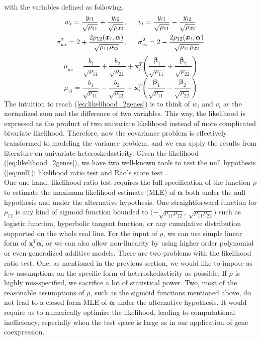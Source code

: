 \documentclass[aoas,preprint]{imsart}
\numberwithin{equation}{section}
\theoremstyle{plain}
\begin{document}
with the variables defined as following.
\begin{align*}
w_i = \frac{y_{i1}}{\sqrt{\rho_{11}}} + \frac{y_{i2}}{\sqrt{\rho_{22}}}, 
\hspace{6mm} &
v_i = \frac{y_{i1}}{\sqrt{\rho_{11}}} - \frac{y_{i2}}{\sqrt{\rho_{22}}}\\
\sigma_{wi}^2 = 2 + \frac{2\rho_{12}(\bm{x}_i, \bm{\alpha})}{\sqrt{\rho_{11}\rho_{22}}}, \hspace{6mm}&
\sigma_{vi}^2 = 2 - \frac{2\rho_{12}(\bm{x}_i, \bm{\alpha})}{\sqrt{\rho_{11}\rho_{22}}}
\end{align*}
$$\mu_{wi} = \frac{{b}_1}{\sqrt{\rho_{11}}} + \frac{{b}_2}{\sqrt{\rho_{22}}} + \bm{x}_i^T \left(\frac{\bm{\beta}_1}{\sqrt{\rho_{11}}} + \frac{\bm{\beta}_2}{\sqrt{\rho_{22}}}\right)$$
$$\mu_{vi} = \frac{{b}_1}{\sqrt{\rho_{11}}} - \frac{{b}_2}{\sqrt{\rho_{22}}} + \bm{x}_i^T \left(\frac{\bm{\beta}_1}{\sqrt{\rho_{11}}} - \frac{\bm{\beta}_2}{\sqrt{\rho_{22}}}\right)$$
The intuition to reach (\ref{eq:likelihood_2genes}) is to think of $w_i$ and $v_i$ as the normalized sum and the difference of two variables. This way, the likelihood is expressed as the product of two univariate likelihood instead of more complicated bivariate likelihood. Therefore, now the covariance problem is effectively transformed to modeling the variance problem, and we can apply the results from literature on univariate heteroskedasticity. Given the likelihood (\ref{eq:likelihood_2genes}), we have two well-known tools to test the null hypothesis (\ref{eq:null}): likelihood ratio test and Rao's score test \cite{breusch1979simple}. \\

One one hand, likelihood ratio test requires the full specification of the function $\rho$ to estimate the maximum likelihood estimate (MLE) of $\bm{\alpha}$ both under the null hypothesis and under the alternative hypothesis. One straightforward function for $\rho_{12}$ is any kind of sigmoid function bounded to $(-\sqrt{\rho_{11}\rho_{22}}$, $\sqrt{\rho_{11}\rho_{22}})$ such as logistic function, hyperbolic tangent function, or any cumulative distribution supported on the whole real line. For the input of $\rho$, we can use simple linear form of $\bm{x}_i^T\bm{\alpha}$, or we can also allow non-linearity by using higher order polynomial or even generalized additive models. There are two problems with the likelihood ratio test. One, as mentioned in the previous section, we would like to impose as few assumptions on the specific form of heteroskedasticity as possible. If $\rho$ is highly mis-specified, we sacrifice a lot of statistical power. Two, most of the reasonable assumptions of $\rho$, such as the sigmoid functions mentioned above, do not lead to a closed form MLE of $\bm{\alpha}$ under the alternative hypothesis. It would require us to numerically optimize the likelihood, leading to computational inefficiency, especially when the test space is large as in our application of gene coexpression. \\
\end{document}
